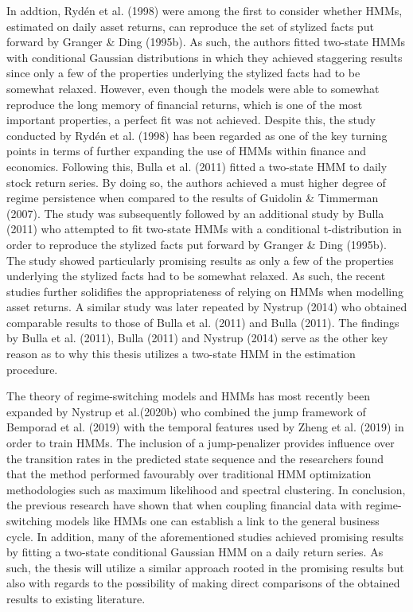 In addtion, Rydén et al. (1998) were among the first to consider whether HMMs, estimated on daily asset returns, can reproduce the set of stylized facts put forward by Granger \& Ding (1995b). As such, the authors fitted two-state HMMs with conditional Gaussian distributions in which they achieved staggering results since only a few of the properties underlying the stylized facts had to be somewhat relaxed. However, even though the models were able to somewhat reproduce the long memory of financial returns, which is one of the most important properties, a perfect fit was not achieved. Despite this, the study conducted by Rydén et al. (1998) has been regarded as one of the key turning points in terms of further expanding the use of HMMs within finance and economics. Following this, Bulla et al. (2011) fitted a two-state HMM to daily stock return series. By doing so, the authors achieved a must higher degree of regime persistence when compared to the results of Guidolin \& Timmerman (2007). The study was subsequently followed by an additional study by Bulla (2011) who attempted to fit two-state HMMs with a conditional t-distribution in order to reproduce the stylized facts put forward by Granger \& Ding (1995b). The study showed particularly promising results as only a few of the properties underlying the stylized facts had to be somewhat relaxed. As such, the recent studies further solidifies the appropriateness of relying on HMMs when modelling asset returns. A similar study was later repeated by Nystrup (2014) who obtained comparable results to those of Bulla et al. (2011) and Bulla (2011). The findings by Bulla et al. (2011), Bulla (2011) and Nystrup (2014) serve as the other key reason as to why this thesis utilizes a two-state HMM in the estimation procedure. 

The theory of regime-switching models and HMMs has most recently been expanded by Nystrup et al.(2020b) who combined the jump framework of Bemporad et al. (2019) with the temporal features used by Zheng et al. (2019) in order to train HMMs. The inclusion of a jump-penalizer provides influence over the transition rates in the predicted state sequence and the researchers found that the method performed favourably over traditional HMM optimization methodologies such as maximum likelihood and spectral clustering. In conclusion, the previous research have shown that when coupling financial data with regime-switching models like HMMs one can establish a link to the general business cycle. In addition, many of the aforementioned studies achieved promising results by fitting a two-state conditional Gaussian HMM on a daily return series. As such, the thesis will utilize a similar approach rooted in the promising results but also with regards to the possibility of making direct comparisons of the obtained results to existing literature. 

